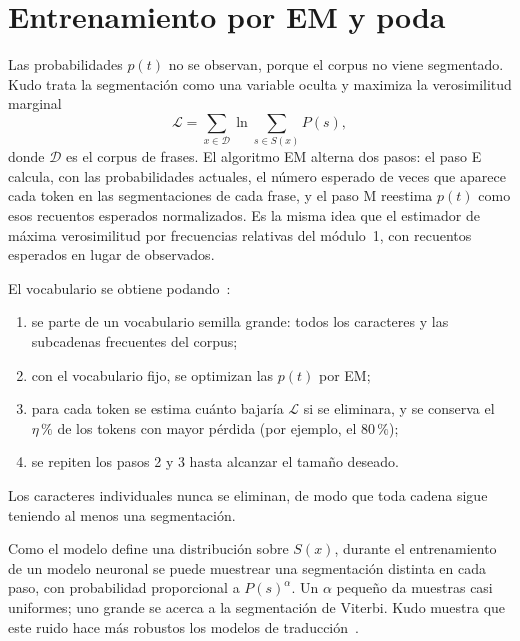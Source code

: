 \addtocounter{definicion}{1}%

\section{Entrenamiento por EM y poda}

Las probabilidades $p(t)$ no se observan, porque el corpus no viene segmentado. Kudo trata la segmentación como una variable oculta y maximiza la verosimilitud marginal~\cite[§3.2]{kudo}
\[
\mathcal{L}=\sum_{x\in\mathcal{D}}\ln\sum_{s\in S(x)}P(s),
\]
donde $\mathcal{D}$ es el corpus de frases. El algoritmo EM alterna dos pasos: el paso E calcula, con las probabilidades actuales, el número esperado de veces que aparece cada token en las segmentaciones de cada frase, y el paso M reestima $p(t)$ como esos recuentos esperados normalizados. Es la misma idea que el estimador de máxima verosimilitud por frecuencias relativas del módulo~1, con recuentos esperados en lugar de observados.

El vocabulario se obtiene podando~\cite[§3.2]{kudo}:
\begin{enumerate}[label=\arabic*.]
  \item se parte de un vocabulario semilla grande: todos los caracteres y las subcadenas frecuentes del corpus;
  \item con el vocabulario fijo, se optimizan las $p(t)$ por EM;
  \item para cada token se estima cuánto bajaría $\mathcal{L}$ si se eliminara, y se conserva el $\eta\,\%$ de los tokens con mayor pérdida (por ejemplo, el $80\,\%$);
  \item se repiten los pasos 2 y 3 hasta alcanzar el tamaño deseado.
\end{enumerate}
Los caracteres individuales nunca se eliminan, de modo que toda cadena sigue teniendo al menos una segmentación.

\begin{observacion}
Como el modelo define una distribución sobre $S(x)$, durante el entrenamiento de un modelo neuronal se puede muestrear una segmentación distinta en cada paso, con probabilidad proporcional a $P(s)^{\alpha}$. Un $\alpha$ pequeño da muestras casi uniformes; uno grande se acerca a la segmentación de Viterbi. Kudo muestra que este ruido hace más robustos los modelos de traducción~\cite[§3.3]{kudo}.
\end{observacion}

